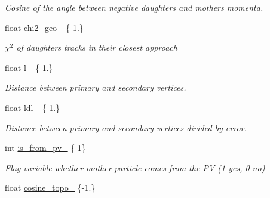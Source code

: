 \begin{DoxyCompactItemize}
\begin{DoxyCompactList}\small\item\em Cosine of the angle between negative daughter\textquotesingle{}s and mother\textquotesingle{}s momenta. \end{DoxyCompactList}\item 
float \hyperlink{classOutputContainer_a1a639d77c7f3241acfc6211ff4c7f866}{chi2\+\_\+geo\+\_\+} \{-\/1.\}\hypertarget{classOutputContainer_a1a639d77c7f3241acfc6211ff4c7f866}{}\label{classOutputContainer_a1a639d77c7f3241acfc6211ff4c7f866}

\begin{DoxyCompactList}\small\item\em $\chi^2$ of daughters\textquotesingle{} tracks in their closest approach \end{DoxyCompactList}\item 
float \hyperlink{classOutputContainer_a691e1165f6e4b13ae933288e5284a2be}{l\+\_\+} \{-\/1.\}\hypertarget{classOutputContainer_a691e1165f6e4b13ae933288e5284a2be}{}\label{classOutputContainer_a691e1165f6e4b13ae933288e5284a2be}

\begin{DoxyCompactList}\small\item\em Distance between primary and secondary vertices. \end{DoxyCompactList}\item 
float \hyperlink{classOutputContainer_a21261aa31314676d64bb84fe4760d78b}{ldl\+\_\+} \{-\/1.\}\hypertarget{classOutputContainer_a21261aa31314676d64bb84fe4760d78b}{}\label{classOutputContainer_a21261aa31314676d64bb84fe4760d78b}

\begin{DoxyCompactList}\small\item\em Distance between primary and secondary vertices divided by error. \end{DoxyCompactList}\item 
int \hyperlink{classOutputContainer_a26034944a5f067f0ec550988bdb63c63}{is\+\_\+from\+\_\+pv\+\_\+} \{-\/1\}\hypertarget{classOutputContainer_a26034944a5f067f0ec550988bdb63c63}{}\label{classOutputContainer_a26034944a5f067f0ec550988bdb63c63}

\begin{DoxyCompactList}\small\item\em Flag variable whether mother particle comes from the PV (1-\/yes, 0-\/no) \end{DoxyCompactList}\item 
float \hyperlink{classOutputContainer_a7acf0c1066c807cefa9b90e5615a3045}{cosine\+\_\+topo\+\_\+} \{-\/1.\}\hypertarget{classOutputContainer_a7acf0c1066c807cefa9b90e5615a3045}{}\label{classOutputContainer_a7acf0c1066c807cefa9b90e5615a3045}


\end{DoxyCompactItemize}

